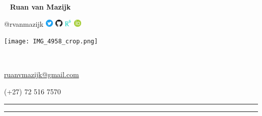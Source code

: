 \begin{multicols}{3}
  \
  \vfill
  \raggedleft
    {\Large \textbf{Ruan van Mazijk}} \par
    {\large @rvanmazijk}
    \href{https://twitter.com/rvanmazijk}
         {\includegraphics[width=1em]{logos/Twitter.png}}
    \href{https://github.com/rvanmazijk}
         {\includegraphics[width=1em]{logos/GitHub.png}}
    \href{https://www.researchgate.net/profile/Ruan-Van-Mazijk}
         {\includegraphics[width=1em]{logos/ResearchGate-white_crop.jpg}}
    \href{https://orcid.org/0000-0003-2659-6909}
         {\includegraphics[width=1em]{logos/ORCID.png}}
  \vfill
  \
  
  \columnbreak
  \begin{center}
    \texttt{[image: IMG\_4958\_crop.png]}
  \end{center}
  \columnbreak
  \par
  
  \
  \vfill
  \raggedright
    {\large \href{mailto:ruanvmazijk@gmail.com}{ruanvmazijk@gmail.com}} \par
    (+27) 72 516 7570
  \vfill
  \
\end{multicols}

\hrule \vskip2pt \hrule
